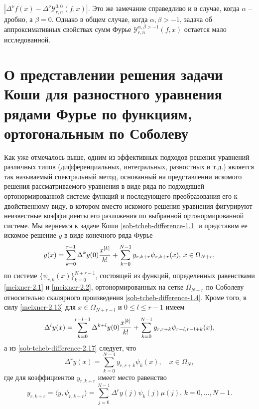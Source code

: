  $ |\Delta^\nu f(x)-\Delta^\nu\mathcal{Y}_{r,n}^{0,0}(f,x)|$. Это же замечание справедливо и в случае, когда $\alpha$ -- дробно, а $\beta=0$. Однако в общем случае, когда $\alpha,\beta>-1$, задача об аппроксимативных свойствах сумм Фурье
 $\mathcal{Y}_{r,n}^{\alpha,\beta>-1}(f,x)$ остается мало исследованной.

\section{О представлении решения задачи Коши для разностного уравнения рядами Фурье по функциям, ортогональным по Соболеву}

Как уже отмечалось выше, одним из эффективных подходов решения уравнений различных типов
(дифференциальных, интегральных, разностных и т.д.) является \cite{Haar-Tcheb-SolDmEg, Haar-Tcheb-Tref1, Haar-Tcheb-Tref2} так называемый спектральный метод, основанный на представлении искомого решения рассматриваемого уравнения в виде ряда по подходящей ортонормированной системе функций  и последующего  преобразования его к двойственному виду, в котором вместо искомого решения уравнения фигурируют  неизвестные коэффициенты его разложения по выбранной ортонормированной системе. Мы вернемся к задаче Коши \eqref{sob-tcheb-difference-1.1} и представим ее искомое решение $y$ в виде конечного ряда Фурье
\begin{equation}\label{sob-tcheb-difference-8.1}
 y(x)= \sum_{k=0}^{r-1}\Delta^ky(0){x^{[k]}\over k!} +\sum_{k=0}^{N-1}y_{r,k+r} \psi_{r,k+r}(x),\, x\in \Omega_{N+r},
  \end{equation}
по системе  $\{\psi_{r,k}(x)\}_{k=0}^{N+r-1}$, состоящей из функций, определенных равенствами   \eqref{meixner-2.1} и \eqref{meixner-2.2}, ортонормированных на сетке $\Omega_{N+r}$ по Соболеву относительно скалярного произведения \eqref{sob-tcheb-difference-1.4}. Кроме того, в силу \eqref{meixner-2.13} для $x\in \Omega_{N+r-l} $ и  $0\le l\le r-1$ имеем
\begin{equation}\label{sob-tcheb-difference-8.2}
 \Delta^l y(x)= \sum_{k=0}^{r-l-1}\Delta^{k+l}y(0){x^{[k]}\over k!} +\sum_{k=0}^{N-1} y_{r,r+k} \psi_{r-l,r-l+k}(x),
  \end{equation}
а из \eqref{sob-tcheb-difference-2.17} следует, что
 \begin{equation}\label{sob-tcheb-difference-8.3}
 \Delta^r y(x)= \sum_{k=0}^{N-1} y_{r,r+k} \psi_{k}(x), \quad x\in \Omega_{N},
  \end{equation}
где для коэффициентов $y_{r,k+r}$ имеет место равенство
\begin{equation}\label{sob-tcheb-difference-8.4}
y_{r,k+r}= \langle y,\psi_{r,k+r} \rangle =
\sum_{j=0}^{N-1}\Delta^ry(j)\psi_{k}(j)\mu(j),\, k=0,\ldots, N-1.
\end{equation}
